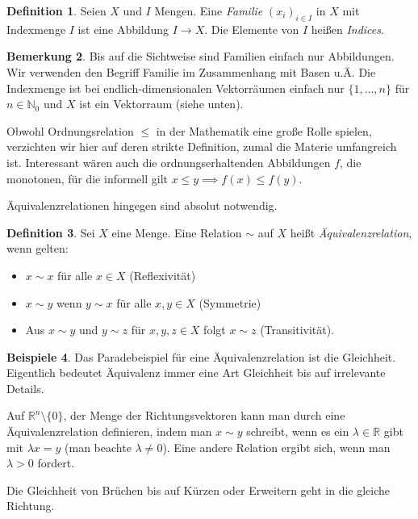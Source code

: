 \documentclass[index=totoc]{scrartcl}%
\theoremstyle{definition}
\newtheorem{defi}{Definition}[section]
\newtheorem{bem}[defi]{Bemerkung}
\newtheorem{bspe}[defi]{Beispiele}
\newcommand{\N}{\mathbb N}
\newcommand{\R}{\mathbb R}
\begin{document}
\begin{defi}
  Seien $X$ und $I$ Mengen. 
  Eine {\em Familie} $(x_i)_{i\in I}$ in $X$ mit Indexmenge $I$
  ist eine Abbildung $I\to X$.
  Die Elemente von $I$ heißen {\em Indices}. 
\end{defi}

\begin{bem}
  Bis auf die Sichtweise sind Familien einfach nur Abbildungen.
  Wir verwenden den Begriff Familie im Zusammenhang mit Basen u.Ä.
  Die Indexmenge ist bei endlich-dimensionalen Vektorräumen einfach nur
  $\{1,\dots,n\}$ für $n\in\N_0$ und $X$ ist ein Vektorraum (siehe unten). 
\end{bem}



Obwohl Ordnungsrelation $\le$ in der Mathematik eine große Rolle spielen,
verzichten wir hier auf deren strikte Definition,
zumal die Materie umfangreich ist.
Interessant wären auch die ordnungserhaltenden Abbildungen $f$,
die monotonen, für die informell gilt $x\le y\implies f(x)\le f(y)$. 

Äquivalenzrelationen hingegen sind absolut notwendig. 


\begin{defi}
  Sei $X$ eine Menge.
  Eine Relation $\sim$ auf $X$ heißt {\em Äquivalenzrelation},
  wenn gelten:
  \begin{itemize}
  \item
    $x\sim x$ für alle $x\in X$ (Reflexivität) 
  \item
    $x\sim y$ wenn $y\sim x$ für alle $x,y\in X$ (Symmetrie) 
  \item
    Aus $x\sim y$ und $y\sim z$  für $x,y,z\in X$ folgt $x\sim z$
    (Transitivität). 
  \end{itemize}
\end{defi}


\begin{bspe}
  Das Paradebeispiel für eine Äquivalenzrelation ist die Gleichheit.
  Eigentlich bedeutet Äquivalenz immer eine Art Gleichheit
  bis auf irrelevante Details.

  Auf $\R^n\setminus\{0\}$, der Menge der Richtungsvektoren
  kann man durch eine Äquivalenzrelation definieren,
  indem man $x\sim y$ schreibt, wenn es ein $\lambda\in\R$ gibt
  mit $\lambda x=y$ (man beachte $\lambda\not=0$).
  Eine andere Relation ergibt sich, wenn man $\lambda>0$ fordert.

  Die Gleichheit von Brüchen bis auf Kürzen oder
  Erweitern geht in die gleiche Richtung.
\end{bspe}
\end{document}
